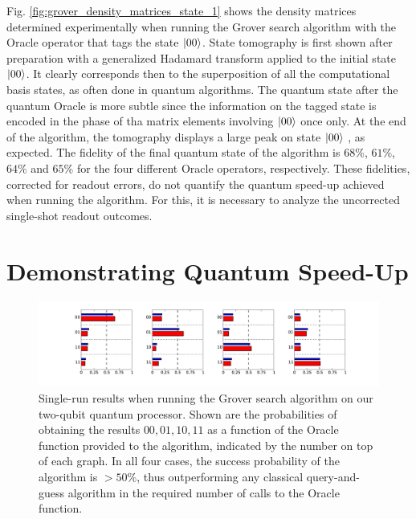 Fig. \ref{fig:grover_density_matrices_state_1} shows the density matrices determined experimentally when running the Grover search  algorithm with the Oracle operator that tags the state $\left| 00 \right>$. State tomography is   first shown after preparation with a generalized Hadamard transform applied to the initial state $\left| 00 \right>$. It clearly corresponds then to the superposition of all the computational basis states, as often done in quantum algorithms.  The quantum state after  the quantum Oracle is more subtle since the information on the tagged state is encoded in the phase of tha matrix elements involving $\left| 00 \right>$ once only. At the end of the algorithm,  the tomography displays a large peak on state  $\left| 00 \right>$ , as expected.  The fidelity of the final quantum state of the algorithm is  $68 \%$, $61 \%$, $64 \%$ and $65 \%$  for the four different Oracle operators, respectively. These fidelities, corrected for readout errors,   do not quantify the quantum speed-up   achieved when running the algorithm. For this, it is necessary to analyze the uncorrected single-shot readout outcomes. 

\section{Demonstrating Quantum Speed-Up}

\begin{figure}[ht!]
		\centering
		\includegraphics[width=1.0\textwidth]{"./data/ct5/2011_04_21 - grover and tomo/good_data/grover algorithm - single run probabilities"}
	\caption[Single-run results of the Grover search algorithm]{Single-run results when running the Grover search algorithm on our two-qubit quantum processor. Shown are the probabilities of obtaining the results $00,01,10,11$ as a function of the Oracle function provided to the algorithm, indicated by the number on top of each graph. In all four cases, the success probability of the algorithm is $> 50 \%$, thus outperforming any classical query-and-guess algorithm in the required number of calls to the Oracle function.}
	\label{fig:grover_single_shot_probabilities}
\end{figure}

